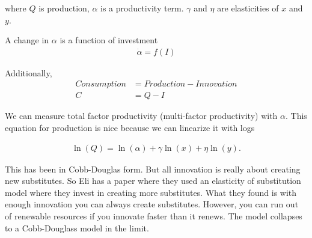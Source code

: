 \documentclass[12pt]{article}
\begin{document}
where $Q$ is production, $\alpha$ is a productivity term. $\gamma$ and $\eta$ are elasticities of $x$ and $y$. 

A change in $\alpha$ is a function of investment 
\begin{align}
    \dot \alpha = f(I)
\end{align}

Additionally, 
\begin{align}
    Consumption &= Production - Innovation \\
    C &= Q - I
\end{align}

We can measure total factor productivity (multi-factor productivity) with $\alpha$. This equation for production is nice because we can linearize it with logs 

\begin{align}
    \ln(Q) = \ln(\alpha) + \gamma \ln(x) + \eta \ln(y).
\end{align}

This has been in Cobb-Douglas form.  But all innovation is really about creating new substitutes. So Eli has a paper where they used an elasticity of substitution model where they invest in creating more substitutes. What they found is with enough innovation you can always create substitutes. However, you can run out of renewable resources if you innovate faster than it renews. The model collapses to a Cobb-Douglass model in the limit. 
\end{document}
